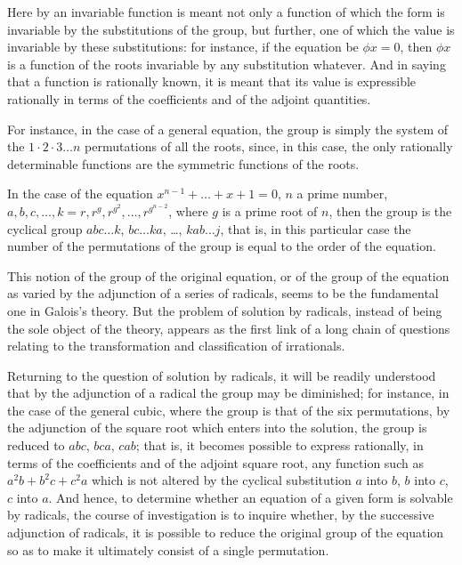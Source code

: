 \documentclass[11pt,a4paper]{article}
\begin{document}
Here by an invariable function is meant not only a function of which the form is invariable by the substitutions of the group, but further, one of which the value is invariable by these substitutions: for instance, if the equation be $\phi x = 0$, then $\phi x$ is a function of the roots invariable by any substitution whatever. And in saying that a function is rationally known, it is meant that its value is expressible rationally in terms of the coefficients and of the adjoint quantities.

For instance, in the case of a general equation, the group is simply the system of the $1 \cdot 2 \cdot 3 \ldots n$ permutations of all the roots, since, in this case, the only rationally determinable functions are the symmetric functions of the roots.

In the case of the equation $x^{n-1} + \ldots + x + 1 = 0$, $n$ a prime number, $a, b, c, \ldots, k = r, r^{g}, r^{g^{2}}, \ldots, r^{g^{n-2}}$, where $g$ is a prime root of $n$, then the group is the cyclical group $abc\ldots k$, $bc\ldots ka$, \ldots, $kab\ldots j$, that is, in this particular case the number of the permutations of the group is equal to the order of the equation.

This notion of the group of the original equation, or of the group of the equation as varied by the adjunction of a series of radicals, seems to be the fundamental one in Galois's theory. But the problem of solution by radicals, instead of being the sole object of the theory, appears as the first link of a long chain of questions relating to the transformation and classification of irrationals.

Returning to the question of solution by radicals, it will be readily understood that by the adjunction of a radical the group may be diminished; for instance, in the case of the general cubic, where the group is that of the six permutations, by the adjunction of the square root which enters into the solution, the group is reduced to $abc$, $bca$, $cab$; that is, it becomes possible to express rationally, in terms of the coefficients and of the adjoint square root, any function such as $a^{2}b + b^{2}c + c^{2}a$ which is not altered by the cyclical substitution $a$ into $b$, $b$ into $c$, $c$ into $a$. And hence, to determine whether an equation of a given form is solvable by radicals, the course of investigation is to inquire whether, by the successive adjunction of radicals, it is possible to reduce the original group of the equation so as to make it ultimately consist of a single permutation.
\end{document}
